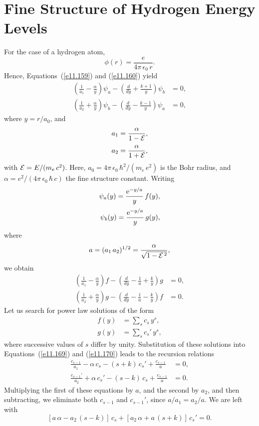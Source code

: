 \section{Fine Structure of Hydrogen Energy Levels}
For the case of a hydrogen atom,
\begin{equation}
\phi(r) = \frac{e}{4\pi\,\epsilon_0\,r}.
\end{equation}
Hence, Equations~(\ref{e11.159}) and (\ref{e11.160}) yield
\begin{align}
\left(\frac{1}{a_1} - \frac{\alpha}{y}\right)\psi_a - \left(\frac{d}{dy} + \frac{k+1}{y}\right)\psi_b &=0,\\[0.5ex]
\left(\frac{1}{a_2} +\frac{\alpha}{y}\right)\psi_b - \left(\frac{d}{dy} - \frac{k-1}{y}\right)\psi_a &=0,
\end{align}
where $y=r/a_0$,  and
\begin{align}
a_1 &= \frac{\alpha}{1-{\cal E}},\\[0.5ex]
a_2&= \frac{\alpha}{1+{\cal E}},
\end{align}
with
 ${\cal E} = E/(m_e\,c^2)$. Here, $a_0= 4\pi\,\epsilon_0\,\hbar^2/(m_e\,e^2)$ is the Bohr radius, and
$\alpha=e^2/(4\pi\,\epsilon_0\,\hbar\,c)$ the fine structure constant. 
Writing
\begin{align}\label{e11.166}
\psi_a(y) = \frac{{\rm e}^{-y/a}}{y}\,f(y),\\[0.5ex]
\psi_b(y) = \frac{{\rm e}^{-y/a}}{y}\,g(y),\label{e11.167}
\end{align}
where
\begin{equation}
a = (a_1\,a_2)^{1/2} = \frac{\alpha}{\sqrt{1-{\cal E}^{\,2}}},
\end{equation}
we obtain
\begin{align}\label{e11.169}
\left(\frac{1}{a_1}-\frac{\alpha}{y}\right)f - \left(\frac{d}{d y}- \frac{1}{a}+\frac{k}{y}\right)g &=0,\\[0.5ex]
\left(\frac{1}{a_2}+\frac{\alpha}{y}\right)g - \left(\frac{d}{d y}- \frac{1}{a}-\frac{k}{y}\right)f &=0.\label{e11.170}
\end{align}
Let us search for power law solutions of the form
\begin{align}\label{e11.171}
f(y)&= \sum_{s} c_s\,y^s,\\[0.5ex]
g(y)&= \sum_s c_s'\,y^s,\label{e11.172}
\end{align}
where successive values of $s$ differ by unity. Substitution of these solutions into Equations~(\ref{e11.169}) and (\ref{e11.170}) leads to the
recursion relations
\begin{align}\label{e11.173}
\frac{c_{s-1}}{a_1} -\alpha\,c_s - (s+k)\,c_s' + \frac{c_{s-1}}{a}&=0,\\[0.5ex]
\frac{c_{s-1}'}{a_2}+\alpha\,c_s' -(s-k)\,c_s + \frac{c_{s-1}}{a}&=0.\label{e11.174}
\end{align}
Multiplying the first of these equations by $a$, and the second by $a_2$, and then subtracting, we eliminate both $c_{s-1}$ and $c_{s-1}'$,
since $a/a_1=a_2/a$. We are left with
\begin{equation}\label{e11.175}
[a\,\alpha-a_2\,(s-k)]\,c_s + [a_2\,\alpha+a\,(s+k)]\,c_{s}' = 0.
\end{equation}

